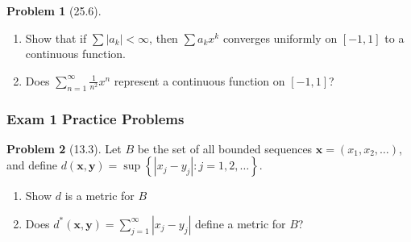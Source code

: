 \documentclass[12pt]{article}
\theoremstyle{definition} %
\newtheorem{problem}{Problem}
\theoremstyle{plain} %
\begin{document}
\begin{problem}[25.6]
\begin{enumerate}
    \item 
    Show that if $\sum \left\vert a_{k} \right\vert  <\infty $, then $\sum a_{k}x^{k}$ converges uniformly on $[-1,1]$ to a continuous function.
    \item Does $\sum_{n=1}^{\infty} \frac{1}{n^{2}}x^{n}$ represent a continuous function on $[-1,1]$? 
\end{enumerate}
\end{problem}
\subsubsection*{Exam 1 Practice Problems}
\begin{problem}[13.3]
   Let $B$ be the set of all bounded sequences $\mathbf{x} =\left( x_1 ,x_2, \ldots    \right) $, and define $d(\mathbf{x} ,\mathbf{y} )=\sup\left\{ \left\vert x_{j}-y_{j} \right\vert  :j=1,2, \ldots  \right\} $.
   \begin{enumerate}
    \item Show $d$ is a metric for $B$ 
    \item Does $d^{*}(\mathbf{x} ,\mathbf{y} )=\sum_{j=1}^{\infty} \left\vert x_{j}-y_{j} \right\vert $ define a metric for $B$?
   \end{enumerate}  
\end{problem}
\end{document}

